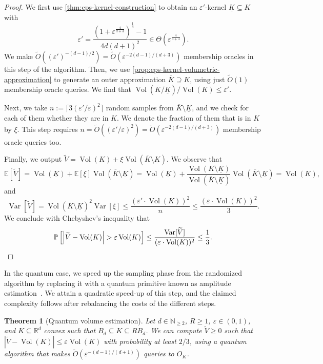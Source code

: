 \documentclass[11pt]{article}
\newtheorem{theorem}{Theorem}[section]
\newcommand{\E}{\ensuremath{\mathbb{E}}}
\newcommand{\N}{\ensuremath{\mathbb{N}}}
\renewcommand{\P}{\ensuremath{\mathbb{P}}}
\newcommand{\R}{\ensuremath{\mathbb{R}}}
\DeclareMathOperator{\Var}{Var}
\DeclareMathOperator{\Vol}{Vol}
\begin{document}
    \begin{proof}
        We first use \cref{thm:eps-kernel-construction} to obtain an $\varepsilon'$-kernel $\underline{K} \subseteq K$ with
        \[\varepsilon' = \frac{(1+\varepsilon^{\frac{4}{d+3}})^{\frac1d}-1}{4d(d+1)^2} \in \Theta\left(\varepsilon^{\frac{4}{d+3}}\right).\]
        We make $\widetilde{O}((\varepsilon')^{-(d-1)/2}) = \widetilde{O}(\varepsilon^{-2(d-1)/(d+3)})$ membership oracles in this step of the algorithm. Then, we use \cref{prop:eps-kernel-volumetric-approximation} to generate an outer approximation $\overline{K} \supseteq K$, using just $\widetilde{O}(1)$ membership oracle queries. We find that $\Vol(\overline{K}/\underline{K})/\Vol(K) \leq \varepsilon'$.

        Next, we take $n := \lceil 3(\varepsilon'/\varepsilon)^2\rceil$ random samples from $\overline{K} \setminus \underline{K}$, and we check for each of them whether they are in $K$. We denote the fraction of them that is in $K$ by $\xi$. This step requires $n = \widetilde{O}((\varepsilon'/\varepsilon)^2) = \widetilde{O}(\varepsilon^{-2(d-1)/(d+3)})$ membership oracle queries too.

        Finally, we output $\widetilde{V} = \Vol(K) + \xi\Vol(\overline{K} \setminus \underline{K})$. We observe that
        \[\E[\widetilde{V}] = \Vol(\underline{K}) + \E[\xi]\Vol(\overline{K} \setminus \underline{K}) = \Vol(\underline{K}) + \frac{\Vol(K \setminus \underline{K})}{\Vol(\overline{K} \setminus \underline{K})}\Vol(\overline{K} \setminus \underline{K}) = \Vol(K),\]
        and
        \[\Var[\widetilde{V}] = \Vol(\overline{K} \setminus \underline{K})^2\Var[\xi] \leq \frac{(\varepsilon' \cdot \Vol(K))^2}{n} \leq \frac{(\varepsilon \cdot \Vol(K))^2}{3}.\]
        We conclude with Chebyshev's inequality that
        \[\P\left[\left|\widetilde{V} - \Vol(K)\right| > \varepsilon\Vol(K)\right] \leq \frac{\Var[\widetilde{V}]}{(\varepsilon \cdot \Vol(K))^2} \leq \frac13.\qedhere\]
    \end{proof}

    In the quantum case, we speed up the sampling phase from the randomized algorithm by replacing it with a quantum primitive known as amplitude estimation~\cite{BHMT98}. We attain a quadratic speed-up of this step, and the claimed complexity follows after rebalancing the costs of the different steps.

    \begin{theorem}[Quantum volume estimation]
        \label{thm:quantum-volume-estimation}
        Let $d \in \N_{\geq 2}$, $R \geq 1$, $\varepsilon \in (0,1)$, and $K \subseteq \R^d$ convex such that $B_d \subseteq K \subseteq RB_d$. We can compute $\widetilde{V} \geq 0$ such that $|\widetilde{V} - \Vol(K)| \leq \varepsilon\Vol(K)$ with probability at least $2/3$, using a quantum algorithm that makes $\widetilde{O}(\varepsilon^{-(d-1)/(d+1)})$ queries to $O_K$.
    \end{theorem}
\end{document}

